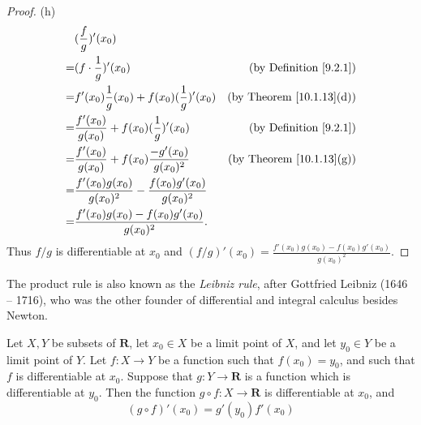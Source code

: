 \begin{proof}{(h)}
    \begin{align*}
          & (\frac{f}{g})'(x_0)                                                                                      \\
        = & (f \cdot \frac{1}{g})'(x_0)                                       & \text{(by Definition \ref{9.2.1})}   \\
        = & f'(x_0) \frac{1}{g}(x_0) + f(x_0) (\frac{1}{g})'(x_0)             & \text{(by Theorem \ref{10.1.13}(d))} \\
        = & \frac{f'(x_0)}{g(x_0)} + f(x_0) (\frac{1}{g})'(x_0)               & \text{(by Definition \ref{9.2.1})}   \\
        = & \frac{f'(x_0)}{g(x_0)} + f(x_0) \frac{-g'(x_0)}{g(x_0)^2}         & \text{(by Theorem \ref{10.1.13}(g))} \\
        = & \frac{f'(x_0) g(x_0)}{g(x_0)^2} - \frac{f(x_0) g'(x_0)}{g(x_0)^2}                                        \\
        = & \frac{f'(x_0) g(x_0) - f(x_0) g'(x_0)}{g(x_0)^2}.                                                        \\
    \end{align*}
    Thus \(f / g\) is differentiable at \(x_0\) and \((f / g)'(x_0) = \frac{f'(x_0) g(x_0) - f(x_0) g'(x_0)}{g(x_0)^2}\).
\end{proof}

\begin{remark}\label{10.1.14}
    The product rule is also known as the \emph{Leibniz rule}, after Gottfried Leibniz (1646 -- 1716), who was the other founder of differential and integral calculus besides Newton.
\end{remark}

\begin{theorem}\label{10.1.15}
    Let \(X, Y\) be subsets of \(\mathbf{R}\), let \(x_0 \in X\) be a limit point of \(X\), and let \(y_0 \in Y\) be a limit point of \(Y\).
    Let \(f : X \to Y\) be a function such that \(f(x_0) = y_0\), and such that \(f\) is differentiable at \(x_0\).
    Suppose that \(g : Y \to \mathbf{R}\) is a function which is differentiable at \(y_0\).
    Then the function \(g \circ f : X \to \mathbf{R}\) is differentiable at \(x_0\), and
    \[
        (g \circ f)'(x_0) = g'(y_0) f'(x_0)
    \]
\end{theorem}

